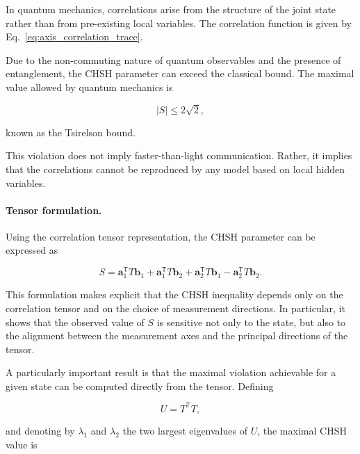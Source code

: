 In quantum mechanics, correlations arise from the structure of the joint state rather than from pre-existing local variables. The correlation function is given by Eq.~\eqref{eq:axis_correlation_trace}.

Due to the non-commuting nature of quantum observables and the presence of entanglement, the CHSH parameter can exceed the classical bound. The maximal value allowed by quantum mechanics is

\begin{equation}
|S| \le 2\sqrt{2},
\label{eq:tsirelson_bound}
\end{equation}

known as the Tsirelson bound.

This violation does not imply faster-than-light communication. Rather, it implies that the correlations cannot be reproduced by any model based on local hidden variables.

\medskip

\paragraph{Tensor formulation.}

Using the correlation tensor representation, the CHSH parameter can be expressed as

\begin{equation}
S
=
\mathbf{a}_1^{\mathsf T} T \mathbf{b}_1
+
\mathbf{a}_1^{\mathsf T} T \mathbf{b}_2
+
\mathbf{a}_2^{\mathsf T} T \mathbf{b}_1
-
\mathbf{a}_2^{\mathsf T} T \mathbf{b}_2.
\label{eq:chsh_tensor_form}
\end{equation}

This formulation makes explicit that the CHSH inequality depends only on the correlation tensor and on the choice of measurement directions. In particular, it shows that the observed value of \( S \) is sensitive not only to the state, but also to the alignment between the measurement axes and the principal directions of the tensor.

\medskip

A particularly important result is that the maximal violation achievable for a given state can be computed directly from the tensor. Defining

\begin{equation}
U = T^{\mathsf T}T,
\label{eq:horodecki_matrix}
\end{equation}

and denoting by \( \lambda_1 \) and \( \lambda_2 \) the two largest eigenvalues of \( U \), the maximal CHSH value is


